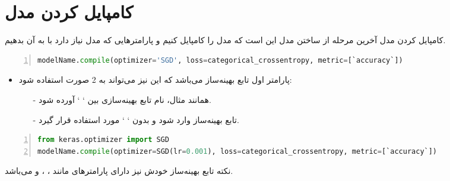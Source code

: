 \documentclass[10pt,xcolor=dvipsnames,professionalfont]{beamer}
\begin{document}
\section{کامپایل کردن مدل}
\begin{frame}[fragile]{کامپایل کردن مدل}
آخرین مرحله از ساختن مدل این است که مدل را کامپایل کنیم و پارامترهایی که مدل نیاز دارد با به آن بدهیم.
\begin{latin}
\begin{lstlisting}[language=Python,frame=single,rulecolor=\color{magenta},numbers=left,numberstyle=\tiny]
modelName.compile(optimizer='SGD', loss=categorical_crossentropy, metric=[`accuracy`])
\end{lstlisting}
\end{latin}

\begin{itemize}
\item
پارامتر اول تابع بهینه‌ساز می‌باشد که این نیز می‌تواند به 2 صورت استفاده شود:
\begin{itemize}
\item[-]
همانند مثال، نام تابع بهینه‌سازی بین ` ` آورده شود.
\item[-]
تابع بهینه‌ساز وارد  شود و بدون ` ` مورد استفاده قرار گیرد.
\end{itemize}
\end{itemize}
\vspace{-0.5cm}

\begin{latin}
\begin{lstlisting}[language=Python,frame=single,rulecolor=\color{magenta},numbers=left,numberstyle=\tiny]
from keras.optimizer import SGD
modelName.compile(optimizer=SGD(lr=0.001), loss=categorical_crossentropy, metric=[`accuracy`])
\end{lstlisting}
\end{latin}

\begin{block}{نکته}
تابع بهینه‌ساز خودش نیز دارای پارامترهای مانند ، ،  و  می‌باشد.
\end{block}

\end{frame}
\end{document}

